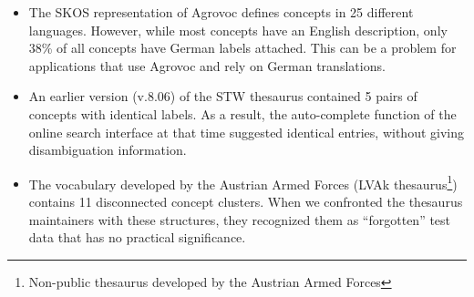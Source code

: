 \begin{itemize}

	\item The SKOS representation of Agrovoc defines concepts in 25 different languages. However, while most concepts have an English description, only 38\% of all concepts have German labels attached. This can be a problem for applications that use Agrovoc and rely on German translations.

	\item An earlier version (v.8.06) of the STW thesaurus contained 5 pairs of concepts with identical labels. As a result, the auto-complete function of the online search interface at that time suggested identical entries, without giving disambiguation information.


	\item The vocabulary developed by the Austrian Armed Forces (LVAk thesaurus\footnote{Non-public thesaurus developed by the Austrian Armed Forces}) contains 11 disconnected concept clusters. When we confronted the thesaurus maintainers with these structures, they recognized them as ``forgotten'' test data that has no practical significance.
	


\end{itemize}

